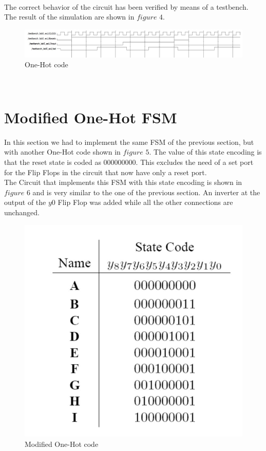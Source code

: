 \documentclass[12pt]{article}
\begin{document}
\\The correct behavior of the circuit has been verified by means of a testbench. The result of the simulation are shown in $figure$ $4$.
\begin{figure}[h]
	\centering
	\includegraphics[scale = 0.7]{immagini/Berchialla/TB1.jpg}
	\caption{One-Hot code}
\end{figure}
\\

\section{Modified One-Hot FSM}
In this section we had to implement the same FSM of the previous section, but with another One-Hot code shown in $figure$ $5$. The value of this state encoding is that the reset state is coded as $000000000$. This excludes the need of a set port for the Flip Flops in the circuit that now have only a reset port.\\
The Circuit that implements this FSM with this state encoding is shown in $figure$ $6$ and is very similar to the one of the previous section. An inverter at the output of the $y0$ Flip Flop was added while all the other connections are unchanged.
\begin{figure}[h]
	\centering
	\includegraphics[scale = 0.7]{immagini/Berchialla/Code2.jpg}
	\caption{Modified One-Hot code}
\end{figure}
\end{document}
